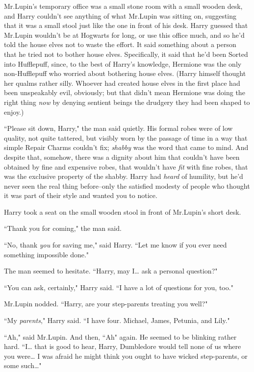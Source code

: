 \later

Mr.\?Lupin's temporary office was a small stone room with a small wooden desk, and Harry couldn't see anything of what Mr.\?Lupin was sitting on, suggesting that it was a small stool just like the one in front of his desk. Harry guessed that Mr.\?Lupin wouldn't be at Hogwarts for long, or use this office much, and so he'd told the house elves not to waste the effort. It said something about a person that he tried not to bother house elves. Specifically, it said that he'd been Sorted into Hufflepuff, since, to the best of Harry's knowledge, Hermione was the only non-Hufflepuff who worried about bothering house elves. (Harry himself thought her qualms rather silly. Whoever had created house elves in the first place had been unspeakably evil, obviously; but that didn't mean Hermione was doing the right thing \emph{now} by denying sentient beings the drudgery they had been shaped to enjoy.)

``Please sit down, Harry," the man said quietly. His formal robes were of low quality, not quite tattered, but visibly worn by the passage of time in a way that simple Repair Charms couldn't fix; \emph{shabby} was the word that came to mind. And despite that, somehow, there was a dignity about him that couldn't have been obtained by fine and expensive robes, that wouldn't have \emph{fit} with fine robes, that was the exclusive property of the shabby. Harry had \emph{heard} of humility, but he'd never seen the real thing before\---only the satisfied modesty of people who thought it was part of their style and wanted you to notice.

Harry took a seat on the small wooden stool in front of Mr.\?Lupin's short desk.

``Thank you for coming," the man said.

``No, thank \emph{you} for saving me," said Harry. ``Let me know if you ever need something impossible done."

The man seemed to hesitate. ``Harry, may I{\ldots} ask a personal question?"

``You can ask, certainly," Harry said. ``I have a lot of questions for you, too."

Mr.\?Lupin nodded. ``Harry, are your step-parents treating you well?"

``My \emph{parents}," Harry said. ``I have four. Michael, James, Petunia, and Lily."

``Ah," said Mr.\?Lupin. And then, ``Ah" again. He seemed to be blinking rather hard. ``I{\ldots} that is good to hear, Harry, Dumbledore would tell none of us where you were{\ldots} I was afraid he might think you ought to have wicked step-parents, or some such{\ldots}"

